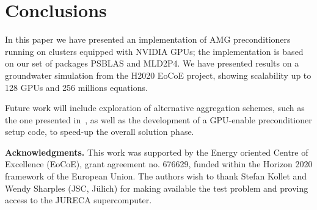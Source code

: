 
\section{Conclusions}
In this paper we have presented an implementation of AMG
preconditioners running on clusters equipped with NVIDIA GPUs; the
implementation is based on our set of packages PSBLAS and MLD2P4. 
We have presented results on a groundwater simulation from the H2020
EoCoE project, showing scalability up to 128 GPUs and 256 millions
equations. 

Future work will include exploration of alternative aggregation
schemes, such as the one presented in~\cite{bcm-toms}, as well as the
development of a GPU-enable preconditioner setup code, to speed-up the
overall solution phase.

\bigskip
\noindent \textbf{Acknowledgments.}
This work was supported by the Energy oriented Centre of Excellence (EoCoE),
grant agreement no. 676629, funded within the Horizon 2020 framework of the European Union.
The authors wish to thank Stefan Kollet and Wendy Sharples (JSC, J\"ulich) for making available
the test problem and proving access to the JURECA supercomputer.